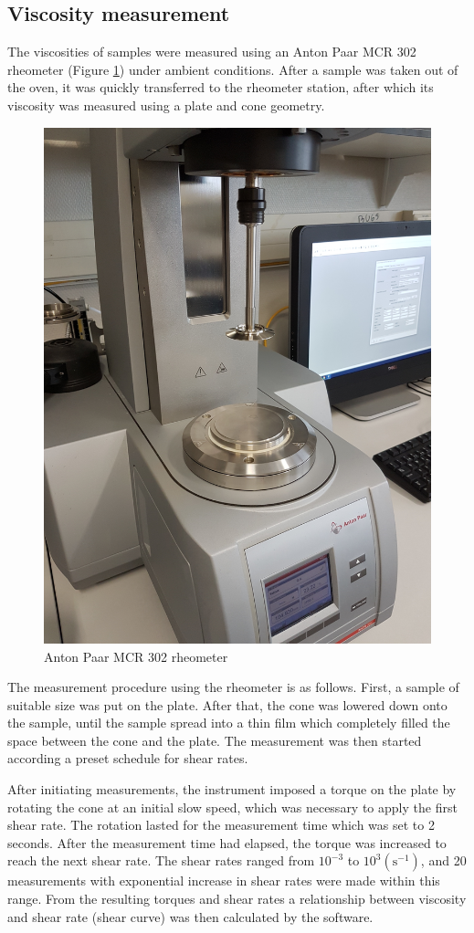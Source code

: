 \subsection{Viscosity measurement}
The  viscosities of samples were measured using an Anton Paar MCR 302 rheometer (Figure \ref{fig:antonPaar}) under ambient conditions. After a sample was taken out of the oven, it was quickly transferred to the rheometer station, after which its viscosity was measured using a plate and cone geometry.

\begin{figure}[h]
    \centering
    \includegraphics[width=.5\textwidth, angle=270]{img/fig/antonpaar.jpg}
    \caption{Anton Paar MCR 302 rheometer}
    \label{fig:antonPaar}
\end{figure}

The measurement procedure using the rheometer is as follows. First, a sample of suitable size was put on the plate. After that, the cone was lowered down onto the sample, until the sample spread into a thin film which completely filled the space between the cone and the plate. The measurement was then started according a preset schedule for shear rates. 

After initiating measurements, the instrument imposed a torque on the plate by rotating the cone at an initial slow speed, which was necessary to apply the first shear rate. The rotation lasted for the measurement time which was set to 2 seconds. After the measurement time had elapsed, the torque was increased to reach the next shear rate. The shear rates ranged from $10^{-3}$ to $10^{3} (\text{s}^{-1})$, and 20 measurements with exponential increase in shear rates were made within this range. From the resulting torques and shear rates a relationship between viscosity and shear rate (shear curve) was then calculated by the software.

